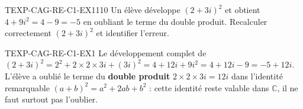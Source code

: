 

\begin{exercice}{TEXP-CAG-RE-C1-EX1}{1}{10}
Un élève développe $(2+3i)^2$ et obtient $4+9i^2=4-9=-5$ en oubliant le terme du double produit. Recalculer correctement $(2+3i)^2$ et identifier l'erreur.
\end{exercice}


\begin{corrige}{TEXP-CAG-RE-C1-EX1}
Le développement complet de $(2+3i)^2 = 2^2 + 2\times2\times3i + (3i)^2 = 4+12i+9i^2 = 4+12i-9 = -5+12i$. L'élève a oublié le terme du \textbf{double produit} $2\times2\times3i=12i$ dans l'identité remarquable $(a+b)^2=a^2+2ab+b^2$ : cette identité reste valable dans $\mathbb{C}$, il ne faut surtout pas l'oublier.
\end{corrige}
